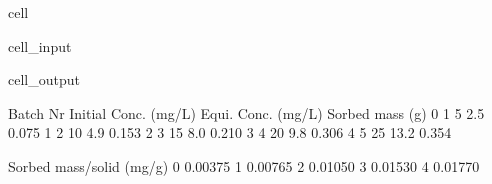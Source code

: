 \documentclass[letterpaper,10pt,english]{jupyterBook}
\begin{document}
\begin{sphinxuseclass}{cell}
\begin{sphinxVerbatimInput}
\begin{sphinxuseclass}{cell_input}
\end{sphinxuseclass}\end{sphinxVerbatimInput}
\begin{sphinxVerbatimOutput}

\begin{sphinxuseclass}{cell_output}
\begin{sphinxVerbatim}[commandchars=\\\{\}]
   Batch Nr  Initial Conc. (mg/L)  Equi. Conc. (mg/L)  Sorbed mass (g)  \PYGZbs{}
0         1                     5                 2.5            0.075   
1         2                    10                 4.9            0.153   
2         3                    15                 8.0            0.210   
3         4                    20                 9.8            0.306   
4         5                    25                13.2            0.354   

   Sorbed mass/solid (mg/g)  
0                   0.00375  
1                   0.00765  
2                   0.01050  
3                   0.01530  
4                   0.01770  
\end{sphinxVerbatim}

\end{sphinxuseclass}\end{sphinxVerbatimOutput}

\end{sphinxuseclass}
\end{document}
